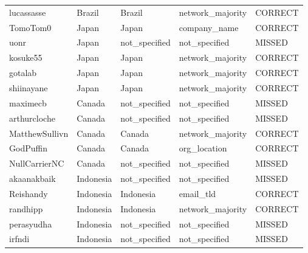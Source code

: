 \documentclass[11pt,a4paper]{article}
\begin{document}
\begin{longtable}{>{\ttfamily\small}p{4.4cm} p{3.0cm} p{3.0cm} p{2.6cm} p{1.6cm}}
\rowcolor{correct}  lucassasse                & Brazil         & Brazil         & network\_majority & CORRECT \\
\rowcolor{correct}  TomoTom0                  & Japan          & Japan          & company\_name    & CORRECT \\
\rowcolor{missed}   uonr                      & Japan          & not\_specified & not\_specified   & MISSED  \\
\rowcolor{correct}  kosuke55                  & Japan          & Japan          & network\_majority & CORRECT \\
\rowcolor{correct}  gotalab                   & Japan          & Japan          & network\_majority & CORRECT \\
\rowcolor{correct}  shiinayane                & Japan          & Japan          & network\_majority & CORRECT \\
\rowcolor{missed}   maximecb                  & Canada         & not\_specified & not\_specified   & MISSED  \\
\rowcolor{missed}   arthurcloche              & Canada         & not\_specified & not\_specified   & MISSED  \\
\rowcolor{correct}  MatthewSullivn            & Canada         & Canada         & network\_majority & CORRECT \\
\rowcolor{correct}  GodPuffin                 & Canada         & Canada         & org\_location    & CORRECT \\
\rowcolor{missed}   NullCarrierNC             & Canada         & not\_specified & not\_specified   & MISSED  \\
\rowcolor{missed}   akaanakbaik               & Indonesia      & not\_specified & not\_specified   & MISSED  \\
\rowcolor{correct}  Reishandy                 & Indonesia      & Indonesia      & email\_tld       & CORRECT \\
\rowcolor{correct}  randhipp                  & Indonesia      & Indonesia      & network\_majority & CORRECT \\
\rowcolor{missed}   perasyudha                & Indonesia      & not\_specified & not\_specified   & MISSED  \\
\rowcolor{missed}   irfndi                    & Indonesia      & not\_specified & not\_specified   & MISSED  \\

\end{longtable}
\end{document}

